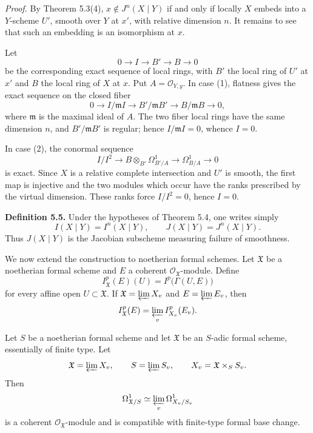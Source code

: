 \documentclass[11pt]{article}
\providecommand{\Oo}{\mathcal O}
\begin{document}
\emph{Proof.}  By Theorem 5.3(4), \(x\notin J^n(X\mid Y)\) if and only if locally \(X\) embeds into a \(Y\)-scheme \(U'\), smooth over \(Y\) at \(x'\), with relative dimension \(n\).  It remains to see that such an embedding is an isomorphism at \(x\).

Let
\[
        0\longrightarrow I\longrightarrow B'\longrightarrow B\longrightarrow 0
\]
be the corresponding exact sequence of local rings, with \(B'\) the local ring of \(U'\) at \(x'\) and \(B\) the local ring of \(X\) at \(x\).  Put \(A=\Oo_{Y,y}\).  In case (1), flatness gives the exact sequence on the closed fiber
\[
        0\longrightarrow I/\mathfrak m I
        \longrightarrow B'/\mathfrak mB'
        \longrightarrow B/\mathfrak mB
        \longrightarrow 0,
\]
where \(\mathfrak m\) is the maximal ideal of \(A\).  The two fiber local rings have the same dimension \(n\), and \(B'/\mathfrak mB'\) is regular; hence \(I/\mathfrak m I=0\), whence \(I=0\).

In case (2), the conormal sequence
\[
        I/I^2\longrightarrow
        B\otimes_{B'}\Omega^1_{B'/A}
        \longrightarrow
        \Omega^1_{B/A}\longrightarrow 0
\]
is exact.  Since \(X\) is a relative complete intersection and \(U'\) is smooth, the first map is injective and the two modules which occur have the ranks prescribed by the virtual dimension.  These ranks force \(I/I^2=0\), hence \(I=0\).

\textbf{Definition 5.5.}  Under the hypotheses of Theorem 5.4, one writes simply
\[
        I(X\mid Y)=I^n(X\mid Y),\qquad
        J(X\mid Y)=J^n(X\mid Y).
\]
Thus \(J(X\mid Y)\) is the Jacobian subscheme measuring failure of smoothness.

We now extend the construction to noetherian formal schemes.  Let \(\mathfrak X\) be a noetherian formal scheme and \(E\) a coherent \(\Oo_{\mathfrak X}\)-module.  Define
\[
        I^p_{\mathfrak X}(E)(U)=I^p\bigl(\Gamma(U,E)\bigr)
\]
for every affine open \(U\subset\mathfrak X\).  If \(\mathfrak X=\varprojlim X_v\) and \(E=\varprojlim E_v\), then
\[
        I^p_{\mathfrak X}(E)=\varprojlim_v I^p_{X_v}(E_v).
\]

Let \(S\) be a noetherian formal scheme and let \(\mathfrak X\) be an \(S\)-adic formal scheme, essentially of finite type.  Let
\[
        \mathfrak X=\varprojlim X_v,\qquad S=\varprojlim S_v,\qquad
        X_v=\mathfrak X\times_S S_v.
\]
Then
\[
        \Omega^1_{\mathfrak X/S}\simeq \varprojlim_v\Omega^1_{X_v/S_v}
\]
is a coherent \(\Oo_{\mathfrak X}\)-module and is compatible with finite-type formal base change.
\end{document}

